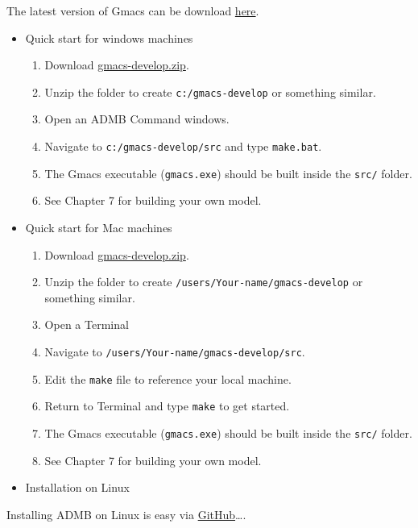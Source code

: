 \documentclass[
]{book}
\providecommand{\tightlist}{%
  \setlength{\itemsep}{0pt}\setlength{\parskip}{0pt}}
\begin{document}
The latest version of Gmacs can be download \href{}{here}.

\begin{itemize}
\tightlist
\item
  Quick start for windows machines

  \begin{enumerate}
  \def\labelenumi{\arabic{enumi}.}
  \tightlist
  \item
    Download \href{https://github.com/seacode/gmacs/archive/develop.zip}{gmacs-develop.zip}.
  \item
    Unzip the folder to create \texttt{c:/gmacs-develop} or something similar.
  \item
    Open an ADMB Command windows.
  \item
    Navigate to \texttt{c:/gmacs-develop/src} and type \texttt{make.bat}.
  \item
    The Gmacs executable (\texttt{gmacs.exe}) should be built inside the \texttt{src/} folder.
  \item
    See Chapter 7 for building your own model.
  \end{enumerate}
\item
  Quick start for Mac machines

  \begin{enumerate}
  \def\labelenumi{\arabic{enumi}.}
  \tightlist
  \item
    Download \href{https://github.com/seacode/gmacs/archive/develop.zip}{gmacs-develop.zip}.
  \item
    Unzip the folder to create \texttt{/users/Your-name/gmacs-develop} or something similar.
  \item
    Open a Terminal
  \item
    Navigate to \texttt{/users/Your-name/gmacs-develop/src}.
  \item
    Edit the \texttt{make} file to reference your local machine.
  \item
    Return to Terminal and type \texttt{make} to get started.
  \item
    The Gmacs executable (\texttt{gmacs.exe}) should be built inside the \texttt{src/} folder.
  \item
    See Chapter 7 for building your own model.
  \end{enumerate}
\item
  Installation on Linux
\end{itemize}

Installing ADMB on Linux is easy via \href{https://github.com/}{GitHub}\ldots.
\end{document}
